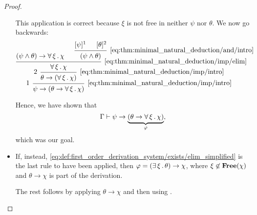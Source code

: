 \begin{proof}
\begin{itemize}
    This application is correct because \( \xi \) is not free in neither \( \psi \) nor \( \theta \). We now go backwards:
    \begin{equation*}
      \begin{prooftree}
        \hypo{ (\psi \wedge \theta) \rightarrow \qforall \xi \chi }

        \hypo{ [\psi]^1 }
        \hypo{ [\theta]^2 }
        \infer2[\eqref{eq:thm:minimal_natural_deduction/and/intro}]{ (\psi \wedge \theta) }
        \infer2[\eqref{eq:thm:minimal_natural_deduction/imp/elim}]{ \qforall \xi \chi }
        \infer[left label=\( 2 \)]1[\eqref{eq:thm:minimal_natural_deduction/imp/intro}]{ \theta \rightarrow (\qforall \xi \chi) }
        \infer[left label=\( 1 \)]1[\eqref{eq:thm:minimal_natural_deduction/imp/intro}]{ \psi \rightarrow (\theta \rightarrow \qforall \xi \chi) }
      \end{prooftree}
    \end{equation*}

    Hence, we have shown that
    \begin{equation*}
      \Gamma \vdash \psi \rightarrow \underbrace{(\theta \rightarrow \forall \thinspace \xi \thinspace . \thinspace \chi)}_{\varphi},
    \end{equation*}
    which was our goal.

    \item If, instead, \eqref{eq:def:first_order_derivation_system/exists/elim_simplified} is the last rule to have been applied, then \( \varphi = (\exists \thinspace \xi \thinspace . \thinspace \theta) \rightarrow \chi \), where \( \xi \not\in \operatorname{\mathbf{Free}}(\chi) \) and \( \theta \rightarrow \chi \) is part of the derivation.

    The rest follows by applying  \( \theta \rightarrow \chi \) and then using .
  \end{itemize}
\end{proof}
